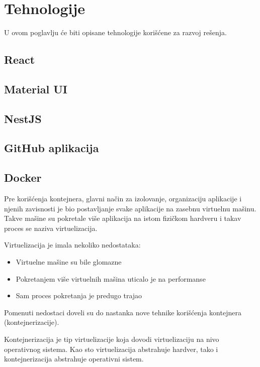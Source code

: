 \chapter{Tehnologije}\label{ch:tehnologije}

U ovom poglavlju će biti opisane tehnologije korišćene za razvoj rešenja.

\section{React}\label{sec:react}

\section{Material UI}\label{sec:material_ui}

\section{NestJS}\label{sec:nestjs}

\section{GitHub aplikacija}\label{sec:github_app}

\section{Docker}\label{sec:docker}

Pre korišćenja kontejnera, glavni način za izolovanje, organizaciju aplikacije i njenih zavisnosti je 
bio postavljanje svake aplikacije na zasebnu virtuelnu mašinu. Takve mašine su pokretale više aplikacija 
na istom fizičkom hardveru i takav proces se naziva virtuelizacija.

Virtuelizacija je imala nekoliko nedostataka: 
\begin{itemize}
    \item Virtuelne mašine su bile glomazne
    \item Pokretanjem više virtuelnih mašina uticalo je na performanse
    \item Sam proces pokretanja je predugo trajao
\end{itemize}

Pomenuti nedostaci doveli su do nastanka nove tehnike korišćenja kontejnera (kontejnerizacije). 

Kontejnerizacija je tip virtuelizacije koja dovodi virtuelizaciju na nivo operativnog 
sistema. Kao sto virtuelizacija abstrahuje hardver, tako i kontejnerizacija abstrahuje 
operativni sistem.


